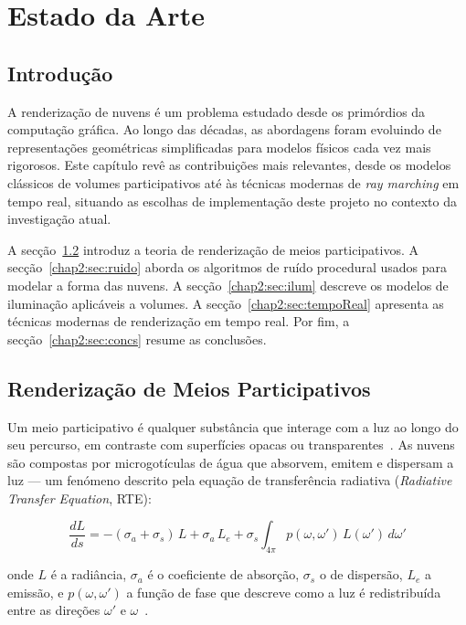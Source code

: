 \chapter{Estado da Arte}
\label{chap:estado-da-arte}

\section{Introdução}
\label{chap2:sec:intro}

A renderização de nuvens é um problema estudado desde os primórdios da computação gráfica. Ao longo das décadas, as abordagens foram evoluindo de representações geométricas simplificadas para modelos físicos cada vez mais rigorosos. Este capítulo revê as contribuições mais relevantes, desde os modelos clássicos de volumes participativos até às técnicas modernas de \emph{ray marching} em tempo real, situando as escolhas de implementação deste projeto no contexto da investigação atual.

A secção~\ref{chap2:sec:volume} introduz a teoria de renderização de meios participativos. A secção~\ref{chap2:sec:ruido} aborda os algoritmos de ruído procedural usados para modelar a forma das nuvens. A secção~\ref{chap2:sec:ilum} descreve os modelos de iluminação aplicáveis a volumes. A secção~\ref{chap2:sec:tempoReal} apresenta as técnicas modernas de renderização em tempo real. Por fim, a secção~\ref{chap2:sec:concs} resume as conclusões.

\section{Renderização de Meios Participativos}
\label{chap2:sec:volume}

Um meio participativo é qualquer substância que interage com a luz ao longo do seu percurso, em contraste com superfícies opacas ou transparentes~\cite{max1995}. As nuvens são compostas por microgotículas de água que absorvem, emitem e dispersam a luz --- um fenómeno descrito pela equação de transferência radiativa (\emph{Radiative Transfer Equation}, RTE):

\begin{equation}
\frac{dL}{ds} = -(\sigma_a + \sigma_s)\,L + \sigma_a\,L_e + \sigma_s \int_{4\pi} p(\omega, \omega')\,L(\omega')\,d\omega'
\label{eq:rte}
\end{equation}

\noindent onde $L$ é a radiância, $\sigma_a$ é o coeficiente de absorção, $\sigma_s$ o de dispersão, $L_e$ a emissão, e $p(\omega, \omega')$ a função de fase que descreve como a luz é redistribuída entre as direções $\omega'$ e $\omega$~\cite{max1995}.

